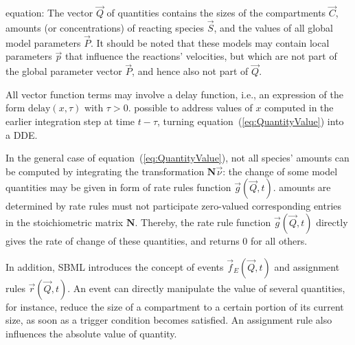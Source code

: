 \documentclass[10pt]{bmc_article}
\newenvironment{bmcformat}{\begin{raggedright}\baselineskip20pt\sloppy\setboolean{publ}{false}}{\end{raggedright}\baselineskip20pt\sloppy}
\begin{document}
\begin{bmcformat}
equation:
The vector $\vec{Q}$ of quantities contains the sizes of the
compartments $\vec{C}$, amounts (or concentrations) of reacting species
$\vec{S}$, and the values of all global model parameters $\vec{P}$.
It should be noted that these models may contain local parameters $\vec{p}$ that
influence the reactions' velocities, but which are not part of the global parameter
vector $\vec{P}$, and hence also not part of $\vec{Q}$.

All vector function terms may involve a delay function, i.e., an expression of 
the form $\mathrm{delay}(x, \tau)$ with $\tau > 0$. 
 possible to address values of $x$ computed in the earlier
integration step at time  $t - \tau$, turning equation~(\ref{eq:QuantityValue})
into a \acf{DDE}. 

In the general case of equation~(\ref{eq:QuantityValue}), not all species' amounts
can be computed by integrating the transformation $\mathbf{N}\vec{\nu}$: the
change of some model quantities may be given in  form of rate rules 
function $\vec{g}(\vec{Q}, t)$.
 amounts are determined by rate rules must not participate  zero-valued corresponding entries in the
stoichiometric matrix $\mathbf{N}$.
Thereby, the rate rule function $\vec{g}(\vec{Q}, t)$ directly gives the rate of
change of these quantities, and returns 0 for all others.

In addition, \acs{SBML} introduces the concept of events $\vec{f}_E(\vec{Q}, t)$ and
assignment rules $\vec{r}(\vec{Q}, t)$.
An event can directly manipulate the value of several quantities, for instance,
reduce the size of a compartment to a certain portion of its current size,
as soon as a trigger condition becomes satisfied.
An assignment rule also influences the absolute value of  quantity.


\end{bmcformat}
\end{document}

